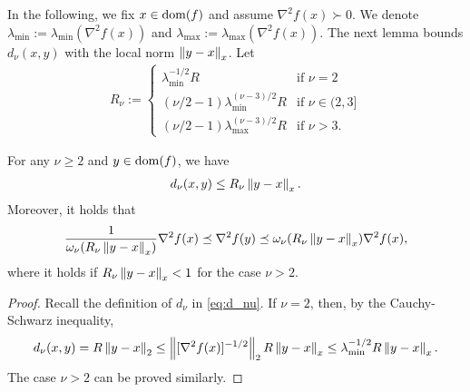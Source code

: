In the following, we fix $x \in \operatorname{dom}(f)$ and assume $\nabla^2 f(x) \succ 0$.
We denote $\lambda_{\min} := \lambda_{\min}(\nabla^2 f(x))$ and $\lambda_{\max} := \lambda_{\max}(\nabla^2 f(x))$.
The next lemma bounds $d_\nu(x, y)$ with the local norm $\left\lVert y - x \right\rVert_x$.
Let
\begin{align}\label{eq:R_nu}
    R_\nu :=
    \begin{cases}
        \lambda_{\min}^{-1/2} R & \mbox{if } \nu = 2 \\
        (\nu/2 -1) \lambda_{\min}^{(\nu - 3)/2} R & \mbox{if } \nu \in (2, 3] \\
        (\nu/2 - 1) \lambda_{\max}^{(\nu - 3)/2} R & \mbox{if } \nu > 3.
    \end{cases}
\end{align}
\begin{lemma}\label{lem:bound_d_nu}
    For any $\nu \ge 2$ and $y \in \operatorname{dom}(f)$, we have
    \begin{align}
        d_\nu(x, y) \le R_\nu \left\lVert y - x \right\rVert_x.
    \end{align}
    Moreover, it holds that
    \begin{align*}
        \frac1{\omega_\nu(R_\nu \left\lVert y - x \right\rVert_x)} \nabla^2 f(x) \preceq \nabla^2 f(y) \preceq \omega_\nu(R_\nu \left\lVert y - x \right\rVert_x) \nabla^2 f(x),
    \end{align*}
    where it holds if $R_\nu \left\lVert y - x \right\rVert_x < 1$ for the case $\nu > 2$.
\end{lemma}
\begin{proof}
    Recall the definition of $d_\nu$ in \eqref{eq:d_nu}.
    If $\nu = 2$, then, by the Cauchy-Schwarz inequality,
    \begin{align*}
        d_\nu(x, y) = R \left\lVert y - x \right\rVert_2 \le \left\lVert [\nabla^2 f(x)]^{-1/2} \right\rVert_2 R \left\lVert y - x \right\rVert_x \le \lambda_{\min}^{-1/2} R \left\lVert y - x \right\rVert_x.
    \end{align*}
    The case $\nu > 2$ can be proved similarly.
\end{proof}

